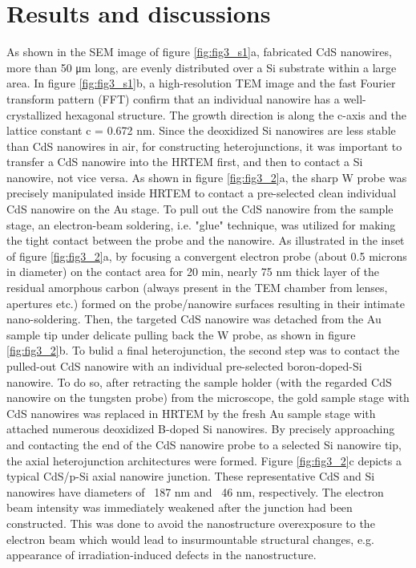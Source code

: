 \section{Results and discussions}
As shown in the SEM image of figure \ref{fig:fig3_s1}a, fabricated CdS nanowires, more than 50 μm long, are evenly distributed over a Si substrate within a large area. In figure \ref{fig:fig3_s1}b, a high-resolution TEM image and the fast Fourier transform pattern (FFT) confirm that an individual nanowire has a well-crystallized hexagonal structure. The growth direction is along the c-axis and the lattice constant c = 0.672 nm. 
Since the deoxidized Si nanowires are less stable than CdS nanowires in air, for constructing heterojunctions, it was important to transfer a CdS nanowire into the HRTEM first, and then to contact a Si nanowire, not vice versa. As shown in figure \ref{fig:fig3_2}a, the sharp W probe was precisely manipulated inside HRTEM to contact a pre-selected clean individual CdS nanowire on the Au stage. To pull out the CdS nanowire from the sample stage, an electron-beam soldering, i.e. "glue" technique, was utilized for making the tight contact between the probe and the nanowire. As illustrated in the inset of figure \ref{fig:fig3_2}a, by focusing a convergent electron probe (about 0.5 microns in diameter) on the contact area for 20 min, nearly 75 nm thick layer of the residual amorphous carbon (always present in the TEM chamber from lenses, apertures etc.) formed on the probe/nanowire surfaces  resulting in their intimate nano-soldering. Then, the targeted CdS nanowire was detached from the Au sample tip under delicate pulling back the W probe, as shown in figure \ref{fig:fig3_2}b. To bulid a final heterojunction, the second step was to contact the pulled-out CdS nanowire with an individual pre-selected boron-doped-Si nanowire. To do so, after retracting the sample holder (with the regarded CdS nanowire on the tungsten probe) from the microscope, the gold sample stage with CdS nanowires was replaced in HRTEM by the fresh Au sample stage with attached numerous deoxidized B-doped Si nanowires. By precisely approaching and contacting the end of the CdS nanowire probe to a selected Si nanowire tip, the axial heterojunction architectures were formed. Figure \ref{fig:fig3_2}c depicts a typical CdS/p-Si axial nanowire junction. These representative CdS and Si nanowires have diameters of ~187 nm and ~46 nm, respectively. The electron beam intensity was immediately weakened after the junction had been constructed. This was done to avoid the nanostructure overexposure to the electron beam which would lead to insurmountable structural changes, e.g. appearance of irradiation-induced defects in the nanostructure.

